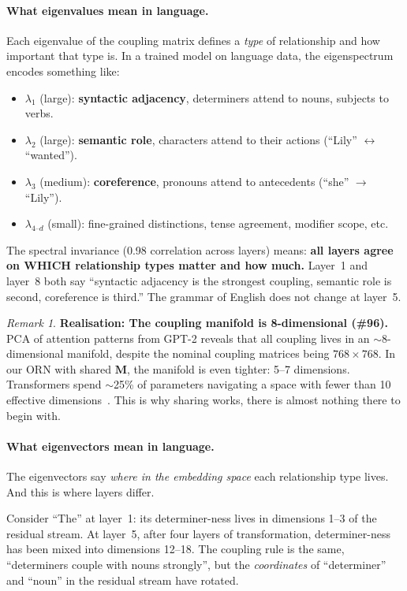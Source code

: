 \documentclass[11pt, a4paper]{article}
\newcommand{\M}{\mathbf{M}}
\theoremstyle{remark}
\newtheorem*{remark}{Remark}
\begin{document}
\paragraph{What eigenvalues mean in language.}
Each eigenvalue of the coupling matrix defines a \emph{type} of relationship and how important that type is.
In a trained model on language data, the eigenspectrum encodes something like:
\begin{itemize}[nosep]
    \item $\lambda_1$ (large): \textbf{syntactic adjacency}, determiners attend to nouns, subjects to verbs.
    \item $\lambda_2$ (large): \textbf{semantic role}, characters attend to their actions (``Lily'' $\leftrightarrow$ ``wanted'').
    \item $\lambda_3$ (medium): \textbf{coreference}, pronouns attend to antecedents (``she'' $\to$ ``Lily'').
    \item $\lambda_{4\text{--}d}$ (small): fine-grained distinctions, tense agreement, modifier scope, etc.
\end{itemize}
The spectral invariance (0.98 correlation across layers) means: \textbf{all layers agree on WHICH relationship types matter and how much.}
Layer~1 and layer~8 both say ``syntactic adjacency is the strongest coupling, semantic role is second, coreference is third.''
The grammar of English does not change at layer~5.

\begin{remark}
\textbf{Realisation: The coupling manifold is 8-dimensional (\#96).}
PCA of attention patterns from GPT-2 reveals that all coupling lives in an $\sim$8-dimensional manifold, despite the nominal coupling matrices being $768 \times 768$.
In our ORN with shared $\M$, the manifold is even tighter: 5--7 dimensions.
Transformers spend $\sim$25\% of parameters navigating a space with fewer than 10 effective dimensions~\cite{masa2025}.
This is why sharing works, there is almost nothing there to begin with.
\end{remark}

\paragraph{What eigenvectors mean in language.}
The eigenvectors say \emph{where in the embedding space} each relationship type lives.
And this is where layers differ.

Consider ``The'' at layer~1: its determiner-ness lives in dimensions 1--3 of the residual stream.
At layer~5, after four layers of transformation, determiner-ness has been mixed into dimensions 12--18.
The coupling rule is the same, ``determiners couple with nouns strongly'', but the \emph{coordinates} of ``determiner'' and ``noun'' in the residual stream have rotated.
\end{document}
